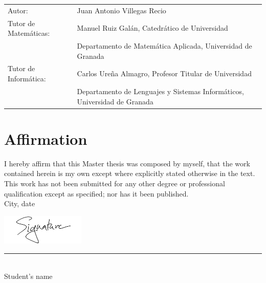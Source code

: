 \documentclass[11pt]{report}
\begin{document}
\begin{titlepage}
	
	\begin{table}[h!]
		\begin{footnotesize} \sffamily
			\begin{tabular}{p{}p{}}
				Autor: & Juan Antonio Villegas Recio \\
				Tutor de Matemáticas:    & Manuel Ruiz Galán, Catedrático de Universidad\\
				& Departamento de Matemática Aplicada, Universidad de Granada \\
				Tutor de Informática:      & Carlos Ureña Almagro, Profesor Titular de Universidad \\
				& Departamento de Lenguajes y Sistemas Informáticos, Universidad de Granada
			\end{tabular}
		\end{footnotesize}
	\end{table}
	
\end{titlepage}

\newpage

\chapter*{Affirmation}


I hereby affirm that this Master thesis was composed by myself, that the work contained herein is my own except where explicitly stated otherwise in the text. This work has not been submitted for any other degree or professional qualification except as specified; nor has it been published. \\
\newline
City, date

\vspace{0cm}
\noindent\includegraphics[width=0.3\textwidth]{img/mysignature.png}

\vspace*{-1.1cm}
\noindent \rule{0.3\textwidth}{.3pt}\\
\vspace{0.3cm}
\noindent \large{Student's name}        %
\end{document}
